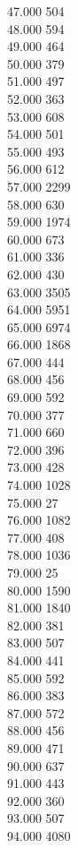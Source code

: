 { 47.000	504 \\
 48.000	594 \\
 49.000	464 \\
 50.000	379 \\
 51.000	497 \\
 52.000	363 \\
 53.000	608 \\
 54.000	501 \\
 55.000	493 \\
 56.000	612 \\
 57.000	2299 \\
 58.000	630 \\
 59.000	1974 \\
 60.000	673 \\
 61.000	336 \\
 62.000	430 \\
 63.000	3505 \\
 64.000	5951 \\
 65.000	6974 \\
 66.000	1868 \\
 67.000	444 \\
 68.000	456 \\
 69.000	592 \\
 70.000	377 \\
 71.000	660 \\
 72.000	396 \\
 73.000	428 \\
 74.000	1028 \\
 75.000	27 \\
 76.000	1082 \\
 77.000	408 \\
 78.000	1036 \\
 79.000	25 \\
 80.000	1590 \\
 81.000	1840 \\
 82.000	381 \\
 83.000	507 \\
 84.000	441 \\
 85.000	592 \\
 86.000	383 \\
 87.000	572 \\
 88.000	456 \\
 89.000	471 \\
 90.000	637 \\
 91.000	443 \\
 92.000	360 \\
 93.000	507 \\
 94.000	4080 \\
}
